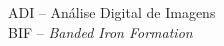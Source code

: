 \noindent \doublespacing
ADI -- Análise Digital de Imagens\\
BIF -- \textit{Banded Iron Formation}\\
